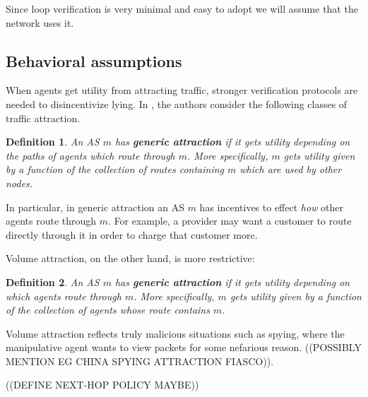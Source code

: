 \documentclass[10pt]{article}
\newtheorem{definition}{Definition}
\begin{document}
    Since loop verification is very minimal and easy to adopt we will assume that
    the network uses it.

  \subsection{Behavioral assumptions}
    When agents get utility from attracting traffic, stronger verification
    protocols are needed to disincentivize lying.
    In \cite{Attraction}, the authors consider the following classes of
    traffic attraction.

    \begin{definition}
      An AS $m$ has \textbf{generic attraction} if it gets utility depending on
      the paths of agents which route through $m$.
      More specifically, $m$ gets utility given by a function of the
      collection of routes containing $m$ which are used by other nodes.
    \end{definition}
    In particular, in generic attraction an AS $m$ has incentives to effect
    \emph{how} other agents route through $m$.
    For example, a provider may want a customer to route directly through it
    in order to charge that customer more.

    Volume attraction, on the other hand, is more restrictive:
    \begin{definition}
      An AS $m$ has \textbf{generic attraction} if it gets utility depending on
      which agents route through $m$.
      More specifically, $m$ gets utility given by a function of the
      collection of agents whose route contains $m$.
    \end{definition}
    Volume attraction reflects truly malicious situations such as spying,
    where the manipulative agent wants to view packets for some nefarious
    reason. ((POSSIBLY MENTION EG CHINA SPYING ATTRACTION FIASCO)).

    ((DEFINE NEXT-HOP POLICY MAYBE))
\end{document}
